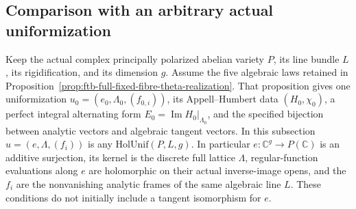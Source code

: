\subsection{Comparison with an arbitrary actual uniformization}
\label{subsec:ftb-arbitrary-complex-uniformization}

Keep the actual complex principally polarized abelian variety \(P\),
its line bundle \(L\), its rigidification, and its dimension \(g\).
Assume the five algebraic laws retained in
Proposition~\ref{prop:ftb-full-fixed-fibre-theta-realization}.
That proposition gives one uniformization
\(u_0=(e_0,\Lambda_0,(f_{0,i}))\), its Appell--Humbert data
\((H_0,\chi_0)\), a perfect integral alternating form
\(E_0=\operatorname{Im}H_0|_{\Lambda_0}\), and the specified
bijection between analytic vectors and algebraic tangent vectors.
In this subsection \(u=(e,\Lambda,(f_i))\) is any
\(\mathrm{HolUnif}(P,L,g)\).
In particular \(e:\mathbb C^g\to P(\mathbb C)\) is an additive
surjection, its kernel is the discrete full lattice \(\Lambda\),
regular-function evaluations along \(e\) are holomorphic on
their actual inverse-image opens, and the \(f_i\) are the
nonvanishing analytic frames of the same algebraic line \(L\).
These conditions do not initially include a tangent isomorphism
for \(e\).


